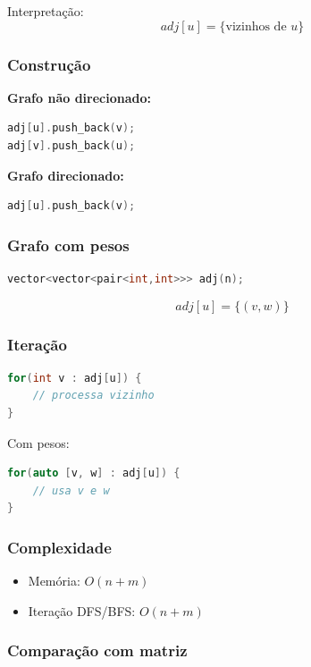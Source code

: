 \documentclass[11pt]{article}
\begin{document}
Interpretação:
\[
adj[u] = \{ \text{vizinhos de } u \}
\]

\subsubsection{Construção}

\textbf{Grafo não direcionado:}
\begin{lstlisting}[language=C++]
adj[u].push_back(v);
adj[v].push_back(u);
\end{lstlisting}

\textbf{Grafo direcionado:}
\begin{lstlisting}[language=C++]
adj[u].push_back(v);
\end{lstlisting}

\subsubsection{Grafo com pesos}

\begin{lstlisting}[language=C++]
vector<vector<pair<int,int>>> adj(n);
\end{lstlisting}

\[
adj[u] = \{ (v, w) \}
\]

\subsubsection{Iteração}

\begin{lstlisting}[language=C++]
for(int v : adj[u]) {
    // processa vizinho
}
\end{lstlisting}

Com pesos:
\begin{lstlisting}[language=C++]
for(auto [v, w] : adj[u]) {
    // usa v e w
}
\end{lstlisting}

\subsubsection{Complexidade}

\begin{itemize}
    \item Memória: $O(n + m)$
    \item Iteração DFS/BFS: $O(n + m)$
\end{itemize}

\subsubsection{Comparação com matriz}
\end{document}
